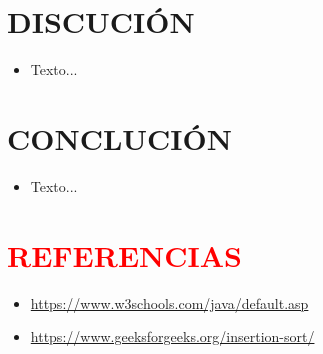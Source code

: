 \documentclass{article}
\begin{document}
\section{DISCUCIÓN}
	\begin{itemize}
		\item Texto...
	\end{itemize}		

\section{CONCLUCIÓN}
	\begin{itemize}
		\item Texto...
	\end{itemize}
\clearpage

\section*{\textcolor{red}{REFERENCIAS}}
\begin{itemize}			
	\item \url{https://www.w3schools.com/java/default.asp}
	\item \url{https://www.geeksforgeeks.org/insertion-sort/}
\end{itemize}	
	
%
%
%
			
\end{document}
